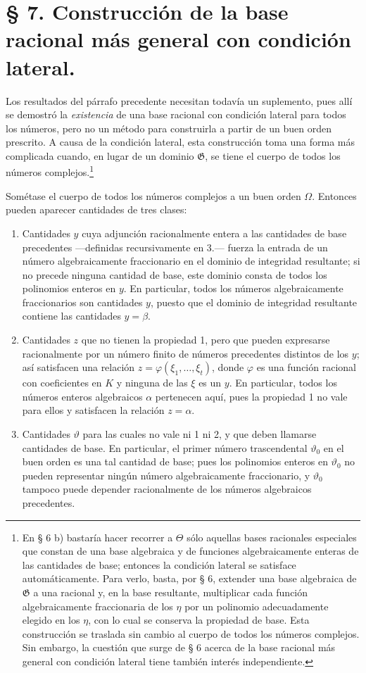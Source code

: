 \documentclass[11pt]{article}
\begin{document}
\section*{§ 7. Construcción de la base racional más general con condición lateral.}

Los resultados del párrafo precedente necesitan todavía un suplemento, pues allí se demostró la \emph{existencia} de una base racional con condición lateral para todos los números, pero no un método para construirla a partir de un buen orden prescrito. A causa de la condición lateral, esta construcción toma una forma más complicada cuando, en lugar de un dominio $\mathfrak G$, se tiene el cuerpo de todos los números complejos.\footnote{En § 6 b) bastaría hacer recorrer a $\Theta$ sólo aquellas bases racionales especiales que constan de una base algebraica y de funciones algebraicamente enteras de las cantidades de base; entonces la condición lateral se satisface automáticamente. Para verlo, basta, por § 6, extender una base algebraica de $\mathfrak G$ a una racional y, en la base resultante, multiplicar cada función algebraicamente fraccionaria de los $\eta$ por un polinomio adecuadamente elegido en los $\eta$, con lo cual se conserva la propiedad de base. Esta construcción se traslada sin cambio al cuerpo de todos los números complejos. Sin embargo, la cuestión que surge de § 6 acerca de la base racional más general con condición lateral tiene también interés independiente.}

Sométase el cuerpo de todos los números complejos a un buen orden $\Omega$. Entonces pueden aparecer cantidades de tres clases:
\begin{enumerate}
\item[1.] Cantidades $y$ cuya adjunción racionalmente entera a las cantidades de base precedentes ---definidas recursivamente en 3.--- fuerza la entrada de un número algebraicamente fraccionario en el dominio de integridad resultante; si no precede ninguna cantidad de base, este dominio consta de todos los polinomios enteros en $y$. En particular, todos los números algebraicamente fraccionarios son cantidades $y$, puesto que el dominio de integridad resultante contiene las cantidades $y=\beta$.
\item[2.] Cantidades $z$ que no tienen la propiedad 1, pero que pueden expresarse racionalmente por un número finito de números precedentes distintos de los $y$; así satisfacen una relación $z=\varphi(\xi_1,\ldots,\xi_t)$, donde $\varphi$ es una función racional con coeficientes en $K$ y ninguna de las $\xi$ es un $y$. En particular, todos los números enteros algebraicos $\alpha$ pertenecen aquí, pues la propiedad 1 no vale para ellos y satisfacen la relación $z=\alpha$.
\item[3.] Cantidades $\vartheta$ para las cuales no vale ni 1 ni 2, y que deben llamarse cantidades de base. En particular, el primer número trascendental $\vartheta_0$ en el buen orden es una tal cantidad de base; pues los polinomios enteros en $\vartheta_0$ no pueden representar ningún número algebraicamente fraccionario, y $\vartheta_0$ tampoco puede depender racionalmente de los números algebraicos precedentes.
\end{enumerate}
\end{document}
